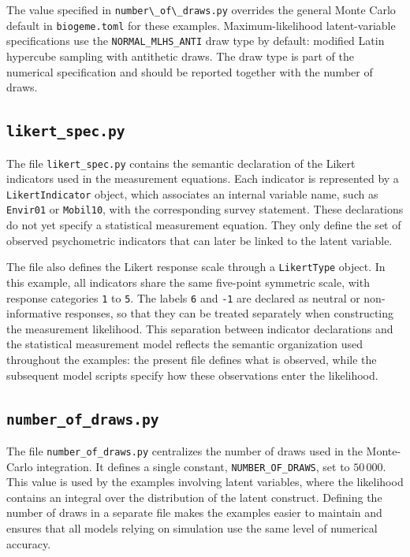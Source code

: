 \documentclass[12pt,a4paper]{article}
\let\OrigUnderscore\_
\def\_{\OrigUnderscore\penalty0\hspace{0pt}}%
\begin{document}
The value specified in \lstinline$number\_of\_draws.py$ overrides the
general Monte Carlo default in \texttt{biogeme.toml} for these examples.
Maximum-likelihood latent-variable specifications use the
\texttt{NORMAL\_MLHS\_ANTI} draw type by default: modified Latin
hypercube sampling with antithetic draws. The draw type is part of the
numerical specification and should be reported together with the number
of draws.


\subsection{\lstinline$likert_spec.py$}
\label{sec:likert_spec.py}


The file \lstinline$likert_spec.py$ contains the semantic declaration
of the Likert indicators used in the measurement equations. Each
indicator is represented by a \lstinline$LikertIndicator$ object,
which associates an internal variable name, such as
\lstinline$Envir01$ or \lstinline$Mobil10$, with the corresponding
survey statement. These declarations do not yet specify a statistical
measurement equation. They only define the set of observed
psychometric indicators that can later be linked to the latent
variable.

The file also defines the Likert response scale through a
\lstinline$LikertType$ object. In this example, all indicators share
the same five-point symmetric scale, with response categories
\lstinline$1$ to \lstinline$5$. The labels \lstinline$6$ and
\lstinline$-1$ are declared as neutral or non-informative responses,
so that they can be treated separately when constructing the
measurement likelihood. This separation between indicator declarations
and the statistical measurement model reflects the semantic
organization used throughout the examples: the present file defines
what is observed, while the subsequent model scripts specify how these
observations enter the likelihood.

\subsection{\lstinline$number_of_draws.py$}
\label{sec:number_of_draws.py}


The file \lstinline$number_of_draws.py$ centralizes the number of
draws used in the Monte-Carlo integration. It defines a single
constant,
\lstinline$NUMBER_OF_DRAWS$, set to \(50\,000\). This value is used by
the examples involving latent variables, where the likelihood contains
an integral over the distribution of the latent construct. Defining
the number of draws in a separate file makes the examples easier to
maintain and ensures that all models relying on simulation use the
same level of numerical accuracy.
\end{document}
